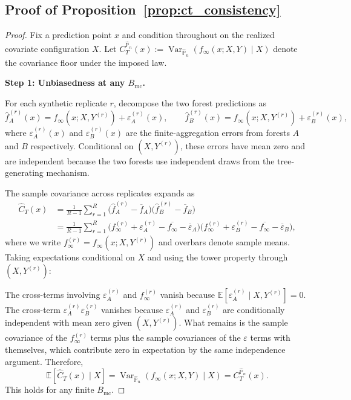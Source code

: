 \documentclass[11pt]{article}
\theoremstyle{plain}
\theoremstyle{definition}
\theoremstyle{remark}
\DeclareMathOperator{\Var}{Var}
\begin{document}
\subsection{Proof of Proposition~\ref{prop:ct_consistency}}
\label{app:ct_consistency}
\begin{proof}
	Fix a prediction point $x$ and condition throughout on the realized covariate configuration $X$. Let $C_T^{\widehat{\mathbb P}_n}(x) := \Var_{\widehat{\mathbb P}_n}(f_\infty(x;X,Y) \mid X)$ denote the covariance floor under the imposed law.
	
	\medskip
	\noindent\textbf{Step 1: Unbiasedness at any $B_{\mathrm{mc}}$.}
	
	For each synthetic replicate $r$, decompose the two forest predictions as
	\[
	\widehat f_{A}^{(r)}(x) = f_\infty(x;X,Y^{(r)}) + \varepsilon_A^{(r)}(x),
	\qquad
	\widehat f_{B}^{(r)}(x) = f_\infty(x;X,Y^{(r)}) + \varepsilon_B^{(r)}(x),
	\]
	where $\varepsilon_A^{(r)}(x)$ and $\varepsilon_B^{(r)}(x)$ are the finite-aggregation errors from forests $A$ and $B$ respectively. Conditional on $(X,Y^{(r)})$, these errors have mean zero and are independent because the two forests use independent draws from the tree-generating mechanism.
	
	The sample covariance across replicates expands as
	\begin{align*}
		\widehat C_T(x)
		&=
		\frac{1}{R-1}\sum_{r=1}^R
		\bigl(\widehat f_A^{(r)} - \overline f_A\bigr)
		\bigl(\widehat f_B^{(r)} - \overline f_B\bigr) \\
		&=
		\frac{1}{R-1}\sum_{r=1}^R
		\bigl(f_\infty^{(r)} + \varepsilon_A^{(r)} - \overline{f_\infty} 
		- \overline\varepsilon_A\bigr)
		\bigl(f_\infty^{(r)} + \varepsilon_B^{(r)} - \overline{f_\infty} 
		- \overline\varepsilon_B\bigr),
	\end{align*}
	where we write $f_\infty^{(r)}=f_\infty(x;X,Y^{(r)})$ and overbars denote sample means. Taking expectations conditional on $X$ and using the tower property through $(X,Y^{(r)})$:
	
	The cross-terms involving $\varepsilon_A^{(r)}$ and $f_\infty^{(r)}$ vanish because $\mathbb E[\varepsilon_A^{(r)}\mid X,Y^{(r)}]=0$. The cross-term $\varepsilon_A^{(r)}\varepsilon_B^{(r)}$ vanishes because $\varepsilon_A^{(r)}$ and $\varepsilon_B^{(r)}$ are conditionally independent with mean zero given $(X,Y^{(r)})$. What remains is the sample covariance of the $f_\infty^{(r)}$ terms plus the sample covariances of the $\varepsilon$ terms with themselves, which contribute zero in expectation by the same independence argument. Therefore,
	\[
	\mathbb E\!\left[\widehat C_T(x)\mid X\right]
	=
	\Var_{\widehat{\mathbb P}_n}\!\left(f_\infty(x;X,Y)\mid X\right)
	=
	C_T^{\widehat{\mathbb P}_n}(x).
	\]
	This holds for any finite $B_{\mathrm{mc}}$.
	

\end{proof}
\end{document}
